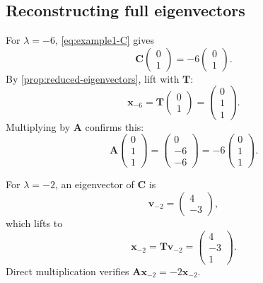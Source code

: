 \documentclass[11pt]{article}
\newcommand{\mat}[1]{\mathbf{#1}}
\newcommand{\vect}[1]{\mathbf{#1}}
\theoremstyle{definition}
\theoremstyle{remark}
\begin{document}
\subsection{Reconstructing full eigenvectors}

For \(\lambda=-6\), \cref{eq:example1-C} gives
\[
  \mat{C}
  \begin{pmatrix}0\\1\end{pmatrix}
  =-6
  \begin{pmatrix}0\\1\end{pmatrix}.
\]
By \cref{prop:reduced-eigenvectors}, lift with \(\mat{T}\):
\begin{equation}
  \vect{x}_{-6}
  =\mat{T}
  \begin{pmatrix}0\\1\end{pmatrix}
  =
  \begin{pmatrix}0\\1\\1\end{pmatrix}.
  \label{eq:example1-eigenvector-minus6}
\end{equation}
Multiplying by \(\mat{A}\) confirms this:
\[
  \mat{A}
  \begin{pmatrix}0\\1\\1\end{pmatrix}
  =
  \begin{pmatrix}0\\-6\\-6\end{pmatrix}
  =-6
  \begin{pmatrix}0\\1\\1\end{pmatrix}.
\]

For \(\lambda=-2\), an eigenvector of \(\mat{C}\) is
\[
  \vect{v}_{-2}
  =
  \begin{pmatrix}4\\-3\end{pmatrix},
\]
which lifts to
\begin{equation}
  \vect{x}_{-2}
  =\mat{T}\vect{v}_{-2}
  =
  \begin{pmatrix}4\\-3\\1\end{pmatrix}.
  \label{eq:example1-eigenvector-minus2}
\end{equation}
Direct multiplication verifies \(\mat{A}\vect{x}_{-2}=-2\vect{x}_{-2}\).
\end{document}
